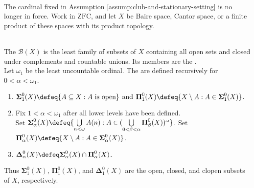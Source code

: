 \begin{assumption} \label{assump:descriptive-set-theory-setting} \\
The cardinal fixed in Assumption \ref{assump:club-and-stationary-setting} is no longer in force. Work in $\mathrm{ZFC}$, and let $X$ be Baire space, Cantor space, or a finite product of these spaces with its product topology.
\end{assumption}

\begin{samepage}
\begin{definition} \label{def:borel-sigma-algebra-and-pointclasses} \\
The  $\mathcal{B}(X)$ is the least family of subsets of $X$ containing all open sets and closed under complements and countable unions. Its members are the .\\
Let $\omega_1$ be the least uncountable ordinal. The  are defined recursively for $0<\alpha<\omega_1$.
\begin{enumerate}[label=(\roman*)]
\setlength{\itemsep}{0pt}
\item $\boldsymbol{\Sigma}^{0}_{1}(X)\defeq\{A\subseteq X:A\text{ is open}\}$ and $\boldsymbol{\Pi}^{0}_{1}(X)\defeq\{X\setminus A:A\in\boldsymbol{\Sigma}^{0}_{1}(X)\}$.
\item Fix $1<\alpha<\omega_1$ after all lower levels have been defined.\\
Set $\boldsymbol{\Sigma}^{0}_{\alpha}(X)\defeq\{\bigcup\limits_{n<\omega}A(n):A\in(\bigcup\limits_{0<\beta<\alpha}\boldsymbol{\Pi}^{0}_{\beta}(X))^{\omega}\}$. Set $\boldsymbol{\Pi}^{0}_{\alpha}(X)\defeq\{X\setminus A:A\in\boldsymbol{\Sigma}^{0}_{\alpha}(X)\}$.
\item $\boldsymbol{\Delta}^{0}_{\alpha}(X)\defeq\boldsymbol{\Sigma}^{0}_{\alpha}(X)\cap\boldsymbol{\Pi}^{0}_{\alpha}(X)$.
\end{enumerate}
Thus $\boldsymbol{\Sigma}^{0}_{1}(X)$, $\boldsymbol{\Pi}^{0}_{1}(X)$, and $\boldsymbol{\Delta}^{0}_{1}(X)$ are the open, closed, and clopen subsets of $X$, respectively.
\end{definition}
\end{samepage}

